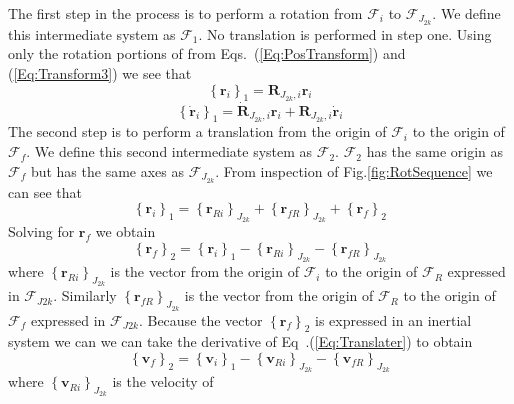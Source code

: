 The first step in the process is to perform a rotation from
$\mathcal{F}_i$ to $\mathcal{F}_{J_{2k}}$. We define this
intermediate system as $\mathcal{F}_1$.  No translation is performed
in step one. Using only the rotation portions of from
Eqs.~(\ref{Eq:PosTransform}) and (\ref{Eq:Transform3}) we see that
%
\begin{equation}
          \left\{\mathbf{r}_i\right\}_{1} = \mathbf{R}_{J_{2k},i}
          \mathbf{r}_{i} \label{Eq:PosRot1}
\end{equation}
%
\begin{equation}
          \left\{\dot{\mathbf{r}}_i\right\}_1 = \dot{\mathbf{R}}_{J_{2k},i}\mathbf{r}_{i} +
          \mathbf{R}_{J_{2k},i}\dot{\mathbf{r}}_{i} \label{Eq:VelRot1}
\end{equation}
%
The second step is to perform a translation from the origin of
$\mathcal{F}_i$ to the origin of $\mathcal{F}_f$.  We define this
second intermediate system as $\mathcal{F}_2$. $\mathcal{F}_2$ has
the same origin as $\mathcal{F}_f$ but has the same axes as
$\mathcal{F}_{J_{2k}}$.  From inspection of
Fig.\ref{fig:RotSequence} we can see that
%
\begin{equation}
     \left\{\mathbf{r}_i\right\}_{1}  = \left\{\mathbf{r}_{Ri}\right\}_{J_{2k}}+ \left\{\mathbf{r}_{fR}\right\}_{J_{2k}} +
     \left\{\mathbf{r}_f\right\}_{2}
\end{equation}
%
Solving for $\mathbf{r}_f$ we obtain
%
\begin{equation}
     \left\{\mathbf{r}_f\right\}_{2} =  \left\{\mathbf{r}_i\right\}_{1} -
      \left\{\mathbf{r}_{Ri}\right\}_{J_{2k}} - \left\{
      \mathbf{r}_{fR}\right\}_{J_{2k}}\label{Eq:Translater}
\end{equation}
%
where $\left\{\mathbf{r}_{Ri}\right\}_{J_{2k}}$ is the vector from
the origin of $\mathcal{F}_i$ to the origin of $\mathcal{F}_R$
expressed in $\mathcal{F}_{J{2k}}$.  Similarly
$\left\{\mathbf{r}_{fR}\right\}_{J_{2k}}$ is the vector from the
origin of $\mathcal{F}_R$ to the origin of $\mathcal{F}_f$
expressed in $\mathcal{F}_{J{2k}}$. Because the vector $ \left\{
\mathbf{r}_f\right\}_2$ is expressed in an inertial system we can
we can take the derivative of Eq~.(\ref{Eq:Translater}) to obtain
%
\begin{equation}
      \left\{\mathbf{v}_f\right\}_{2} =  \left\{\mathbf{v}_i\right\}_{1} - \left\{ \mathbf{v}_{Ri} \right\}_{J_{2k}} - \left\{\mathbf{v}_{fR}\right\}_{J_{2k}}
\end{equation}
%
where $\left\{\mathbf{v}_{Ri}\right\}_{J_{2k}}$ is the velocity of

